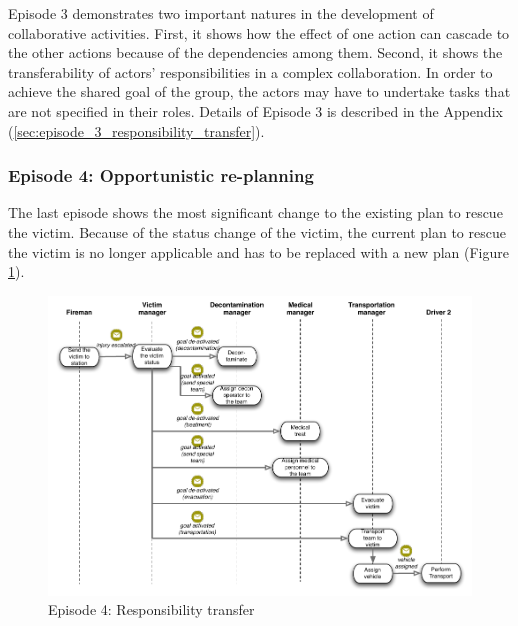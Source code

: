 Episode 3 demonstrates two important natures in the development of collaborative activities. First, it shows how the effect of one action can cascade to the other actions because of the dependencies among them. Second, it shows the transferability of actors' responsibilities in a complex collaboration. In order to achieve the shared goal of the group, the actors may have to undertake tasks that are not specified in their roles. Details of Episode 3 is described in the Appendix (\ref{sec:episode_3_responsibility_transfer}).

\subsubsection{Episode 4: Opportunistic re-planning} %
\label{ssub:episode_4_opportunistic_re_planning}
The last episode shows the most significant change to the existing plan to rescue the victim. Because of the status change of the victim, the current plan to rescue the victim is no longer applicable and has to be replaced with a new plan (Figure \ref{fig:episode_4_interaction}).

\begin{figure}[htbp] %
   \centering
   \includegraphics[width=5.8in]{episode_4_interaction.pdf} 
   \caption{Episode 4: Responsibility transfer}
   \label{fig:episode_4_interaction}
\end{figure}


